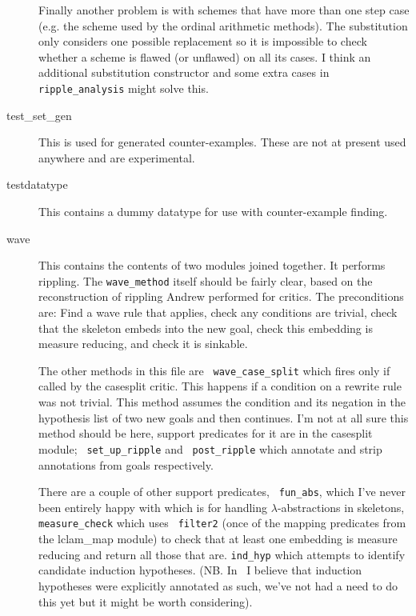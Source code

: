 \begin{description}
  Finally another problem is with schemes that
  have more than one step case (e.g. the scheme used
  by the ordinal arithmetic methods).  The
  substitution only considers one possible
  replacement so it is impossible to check whether a scheme is flawed
  (or unflawed) on all its cases.  I
  think an additional substitution constructor and some extra cases in
  {\tt ripple\_analysis} might solve this.
\item[test\_set\_gen\index{test\_set\_gen module}] This is used for
  generated counter-examples.  These are not at present used anywhere
  and are experimental.
\item[testdatatype\index{testdatatype module}] This contains a dummy
  datatype for use with counter-example finding.
\item[wave\index{wave module}] This contains the contents of two
  modules joined together.  It performs rippling.  The
  {\tt wave\_method} itself should be fairly
  clear, based on the reconstruction of rippling Andrew performed for
  critics.  The preconditions are:
  Find a wave rule that applies, check any conditions
  are trivial, check that the skeleton embeds into the
  new goal, check this embedding is measure
  reducing, and check it is
  sinkable.
  
  The other methods in this file are {\tt
    wave\_case\_split} which fires only if
  called by the casesplit critic.  This
  happens if a condition on a rewrite rule was not trivial.  This
  method assumes the condition and its negation in the hypothesis list
  of two new goals and then continues.  I'm not at all sure this
  method should be here, support predicates for it are in the
  casesplit module; {\tt
    set\_up\_ripple} and {\tt
    post\_ripple} which annotate and strip
  annotations from goals respectively.
  
  There are a couple of other support predicates, {\tt
    fun\_abs}, which I've never been entirely happy
  with which is for handling $\lambda$-abstractions in skeletons, {\tt
    measure\_check} which uses {\tt
    filter2} (once of the mapping predicates from the
  lclam\_map module) to check that at least
  one embedding is measure reducing and return all those that are.
  {\tt ind\_hyp} which attempts to identify candidate
  induction hypotheses.  (NB. In \clam\ I believe that induction
  hypotheses were explicitly annotated as such, we've not had a need
  to do this yet but it might be worth considering).


\end{description}
